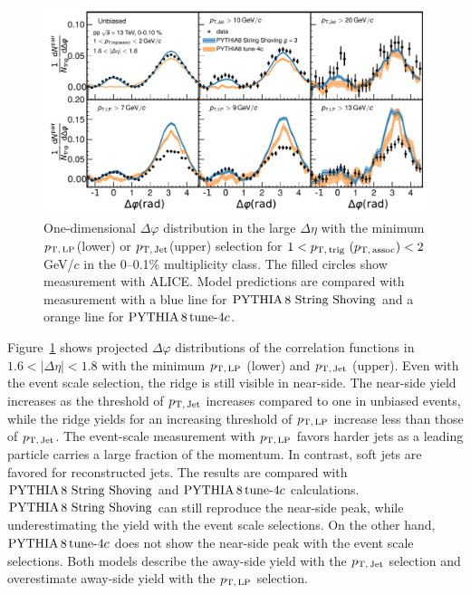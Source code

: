 \begin{figure}[h!]
	\centering
	\includegraphics[width=0.99\linewidth]{./figures/Fig5_PlotDeltaPhiESE.pdf}
	\caption{ One-dimensional $\Delta\varphi$ distribution in the large $\Delta\eta$ with the minimum $p_\mathrm{T,\,LP}$(lower) or $p_\mathrm{T,\,Jet}$(upper) selection for $1< p_\mathrm{T,\,trig}~\mathrm (p_\mathrm{T,\,assoc}) <2$ GeV/$c$ in the 0--0.1\% multiplicity class. The filled circles show measurement with ALICE. Model predictions are compared with measurement with a blue line for $\mathrm{PYTHIA}\,8~\mathrm{String}~\mathrm{Shoving}$  and a orange line for $\mathrm{PYTHIA}\,8\,\mathrm{tune}{\text -}4c$.}
	\label{fig:PlotDeltaPhiESE}
\end{figure}

Figure~\ref{fig:PlotDeltaPhiESE} shows projected $\Delta\varphi$ distributions of the correlation functions in $1.6<|\Delta\eta|<1.8$ with the minimum $p_\mathrm{T,\,LP}$ (lower) and $p_\mathrm{T,\,Jet}$ (upper). Even with the event scale selection, the ridge is still visible in near-side. The near-side yield increases as the threshold of $p_\mathrm{T,\,Jet}$ increases compared to one in unbiased events, while the ridge yields for an increasing threshold of $p_\mathrm{T,\,LP}$ increase less than those of $p_\mathrm{T,\,Jet}$. The event-scale measurement with $p_\mathrm{T,\,LP}$ favors harder jets as a leading particle carries a large fraction of the momentum. In contrast, soft jets are favored for reconstructed jets. The results are compared with $\mathrm{PYTHIA}\,8~\mathrm{String}~\mathrm{Shoving}$ and $\mathrm{PYTHIA}\,8\,\mathrm{tune}{\text -}4c$ calculations. $\mathrm{PYTHIA}\,8~\mathrm{String}~\mathrm{Shoving}$ can still reproduce the near-side peak, while underestimating the yield with the event scale selections. On the other hand, $\mathrm{PYTHIA}\,8\,\mathrm{tune}{\text -}4c$ does not show the near-side peak with the event scale selections. Both models describe the away-side yield with the $p_\mathrm{T,\,Jet}$ selection and overestimate away-side yield with the $p_\mathrm{T,\,LP}$ selection.

